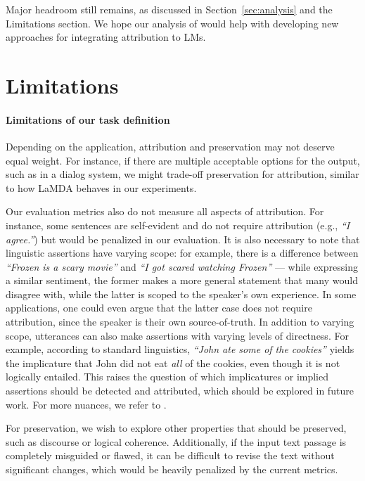 \documentclass[11pt]{article}
\begin{document}
Major headroom still remains, as discussed in Section~\ref{sec:analysis} and the Limitations section. We hope our analysis of \approach{} would help with developing new approaches for integrating attribution to LMs.


\section{Limitations}

\paragraph{Limitations of our task definition}
Depending on the application, attribution and preservation may not deserve equal weight. For instance, if there are multiple acceptable options for the output, such as in a dialog system, we might trade-off preservation for attribution, similar to how LaMDA behaves in our experiments.

Our evaluation metrics also do not measure all aspects of attribution. For instance, some sentences are self-evident and do not require attribution (e.g., \emph{``I agree.''}) but would be penalized in our evaluation.
It is also necessary to note that linguistic assertions have varying scope: for example, there is a difference between \emph{``Frozen is a scary movie''} and \emph{``I got scared watching Frozen''} --- while expressing a similar sentiment, the former makes a more general statement that many would disagree with, while the latter is scoped to the speaker's own experience. In some applications, one could even argue that the latter case does not require attribution, since the speaker is their own source-of-truth. In addition to varying scope, utterances can also make assertions with varying levels of directness. For example, according to standard linguistics, \emph{``John ate some of the cookies''} yields the implicature that John did not eat \emph{all} of the cookies, even though it is not logically entailed. This raises the question of which implicatures or implied assertions should be detected and attributed, which should be explored in future work. For more nuances, we refer to \citet{Rashkin2021AIS}.

For preservation, we wish to explore other properties that should be preserved, such as discourse or logical coherence. Additionally, if the input text passage is completely misguided or flawed, it can be difficult to revise the text without significant changes, which would be heavily penalized by the current metrics.
\end{document}
